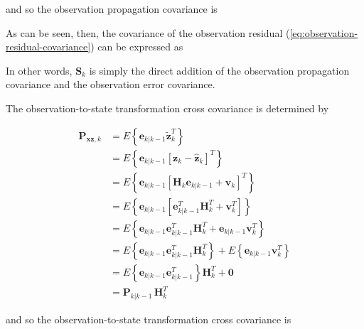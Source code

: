 and so the observation propagation covariance is


As can be seen, then, the covariance of the observation residual (\ref{eq:observation-residual-covariance})
can be expressed as


In other words, $\mathbf{S}_{k}$ is simply the direct addition of the observation
propagation covariance and the observation error covariance.

The observation-to-state transformation cross covariance is determined by

\begin{equation*}
    \begin{aligned}
        \mathbf{P}_{\mathbf{xz},k} &= E \left\{ \mathbf{e}_{k|k-1} \tilde{\mathbf{z}}_k^T \right\} \\
        &= E \left\{ \mathbf{e}_{k|k-1} \left[ \mathbf{z}_k - \hat{\mathbf{z}}_k \right]^T \right\} \\
        &= E \left\{ \mathbf{e}_{k|k-1} \left[ \mathbf{H}_k \mathbf{e}_{k|k-1} + \mathbf{v}_k \right]^T \right\} \\
        &= E \left\{ \mathbf{e}_{k|k-1} \left[ \mathbf{e}_{k|k-1}^T \mathbf{H}_k^T + \mathbf{v}_k^T \right] \right\} \\
        &= E \left\{ \mathbf{e}_{k|k-1} \mathbf{e}_{k|k-1}^T \mathbf{H}_k^T + \mathbf{e}_{k|k-1} \mathbf{v}_k^T \right\} \\
        &= E \left\{ \mathbf{e}_{k|k-1} \mathbf{e}_{k|k-1}^T \mathbf{H}_k^T \right\} + E \left\{ \mathbf{e}_{k|k-1} \mathbf{v}_k^T \right\} \\
        &= E \left\{ \mathbf{e}_{k|k-1} \mathbf{e}_{k|k-1}^T \right\} \mathbf{H}_k^T + \mathbf{0} \\
        &= \mathbf{P}_{k|k-1} \, \mathbf{H}_{k}^T
    \end{aligned}
\end{equation*}

and so the observation-to-state transformation cross covariance is

